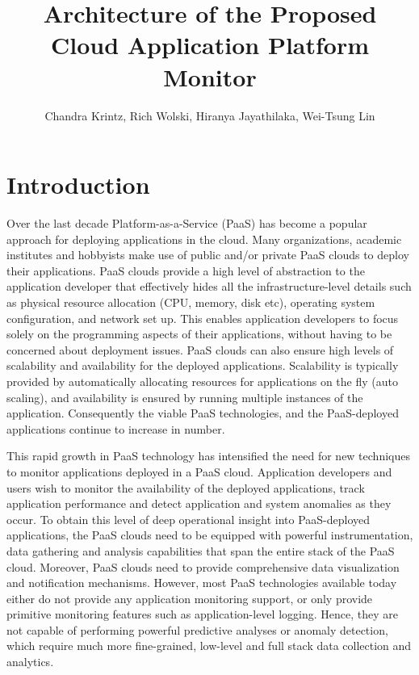\documentclass[11pt]{report}
\begin{document}
\title{Architecture of the Proposed Cloud Application Platform Monitor}
\author{Chandra Krintz, Rich Wolski, Hiranya Jayathilaka, Wei-Tsung Lin}
\maketitle

\section{Introduction}
Over the last decade Platform-as-a-Service (PaaS) has become a popular approach for deploying
applications in the cloud. Many organizations, academic institutes and hobbyists make use of public
and/or private PaaS clouds to deploy their applications.
PaaS clouds provide a high level of abstraction to the application developer that effectively hides
all the infrastructure-level details such as physical resource allocation (CPU, memory, disk etc), operating
system configuration, 
and network set up. This enables application developers to focus solely on the programming
aspects of their applications, without having to be concerned about deployment issues. PaaS
clouds can also ensure high levels of scalability and availability for the deployed applications. 
Scalability is typically provided by automatically allocating resources for applications
on the fly (auto scaling), and availability is ensured by running multiple instances of the application.
Consequently the viable PaaS technologies, and the PaaS-deployed applications
continue to increase in number.

This rapid growth in PaaS technology has intensified the need for new techniques to
monitor applications deployed in a PaaS cloud. Application developers and users wish
to monitor the availability of the deployed applications, track application performance and detect 
application and system anomalies as they occur. To obtain this level of deep operational insight into
PaaS-deployed applications, the PaaS clouds need to be equipped with powerful instrumentation,
data gathering and analysis capabilities that span the entire stack of the PaaS cloud. 
Moreover, PaaS clouds need to provide comprehensive
data visualization and notification mechanisms. However, most PaaS technologies available
today either do not provide any application monitoring support, or only provide primitive
monitoring features such as application-level logging. Hence, they are not capable of performing
powerful predictive analyses or anomaly detection, which require much more fine-grained, low-level
and full stack data collection and analytics. 
\end{document}

